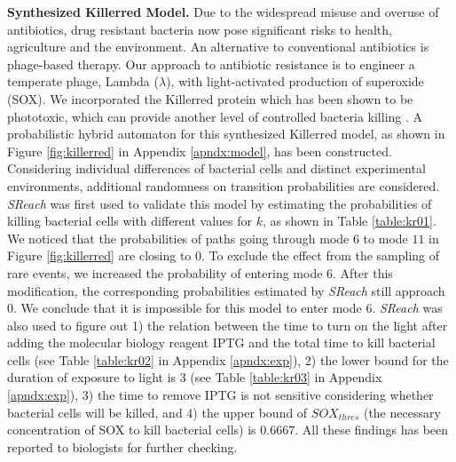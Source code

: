\vspace{-.1cm}

{\bf Synthesized Killerred Model.} Due to the widespread misuse and overuse of antibiotics, drug resistant bacteria now pose significant risks to health, agriculture and the environment. An alternative to conventional antibiotics is phage-based therapy. Our approach to antibiotic resistance is to engineer a temperate phage, Lambda ($\lambda$), with light-activated production of superoxide (SOX). We incorporated the Killerred protein which has been shown to be phototoxic, which can provide another level of controlled bacteria killing \cite{natasa2014killerred}. A probabilistic hybrid automaton for this synthesized Killerred model, as shown in Figure \ref{fig:killerred} in Appendix \ref{apndx:model}, has been constructed. Considering individual differences of bacterial cells and distinct experimental environments, additional randomness on transition probabilities are considered. {\it SReach} was first used to validate this model by estimating the probabilities of killing bacterial cells with different values for $k$, as shown in Table \ref{table:kr01}. We noticed that the probabilities of paths going through mode $6$ to mode $11$ in Figure \ref{fig:killerred} are closing to $0$. To exclude the effect from the sampling of rare events, we increased the probability of entering mode $6$. After this modification, the corresponding probabilities estimated by {\it SReach} still approach $0$. We conclude that it is impossible for this model to enter mode $6$. {\it SReach} was also used to figure out 1) the relation between the time to turn on the light after adding the molecular biology reagent IPTG and the total time to kill bacterial cells (see Table \ref{table:kr02} in Appendix \ref{apndx:exp}), 2) the lower bound for the duration of exposure to light is $3$ (see Table \ref{table:kr03} in Appendix \ref{apndx:exp}), 3) the time to remove IPTG is not sensitive considering whether bacterial cells will be killed, and 4) the upper bound of $SOX_{thres}$ (the necessary concentration of SOX to kill bacterial cells) is $0.6667$. All these findings has been reported to biologists for further checking.

